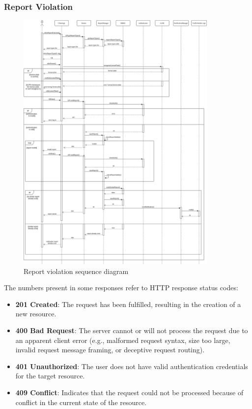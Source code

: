 \documentclass{article}
\begin{document}
\subsubsection{Report Violation}
\begin{figure}[ht]
\centering
	\includegraphics[width=0.88\textwidth]{images/report-violation-sequence.png}
	\caption{Report violation sequence diagram}
	\label{fig:report-violation-sequence-diagram}
\end{figure}
The numbers present in some responses refer to HTTP response status codes:
\begin{itemize}
	\item \textbf{201 Created}: The request has been fulfilled, resulting in the creation of a new resource.
	\item \textbf{400 Bad Request}: The server cannot or will not process the request due to an apparent client error (e.g., malformed request syntax, size too large, invalid request message framing, or deceptive request routing).
	\item \textbf{401 Unauthorized}: The user does not have valid authentication credentials for the target resource.
	\item \textbf{409 Conflict}: Indicates that the request could not be processed because of conflict in the current state of the resource. 
\end{itemize}
\end{document}
